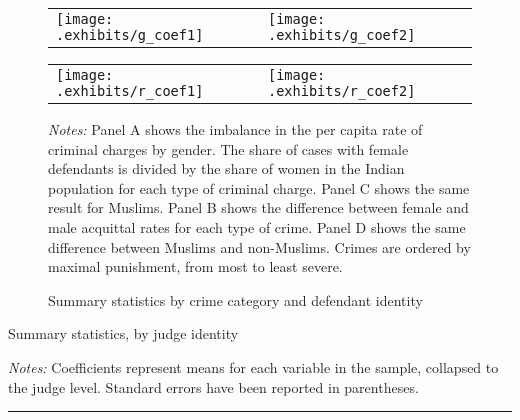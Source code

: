 \documentclass[12pt,english]{article}
\begin{document}
    \begin{sidewaysfigure}
      \centering
      \caption{Summary statistics by
        crime category and defendant identity}
      \label{fig:summary}
            \begin{tabular}{@{}ll@{}}
        \texttt{[image: .exhibits/g\_coef1]} &
        \texttt{[image: .exhibits/g\_coef2]} \\
      \end{tabular}
      \begin{tabular}{@{}ll@{}}
        \texttt{[image: .exhibits/r\_coef1]} &
        \texttt{[image: .exhibits/r\_coef2]} \\
      \end{tabular}
      
  \begin{minipage}{1.0\textwidth}
    {\scriptsize \emph{Notes:}       Panel A shows the imbalance in the per capita rate of criminal charges by gender.  The share of cases with female defendants is divided by the share of women in the Indian population for each type of criminal charge. Panel C shows the same result for Muslims. Panel B shows the difference between female and male acquittal rates for each type of crime. Panel D shows the same difference between Muslims and non-Muslims. Crimes are ordered by maximal punishment, from most to least severe.


 \par}
   \end{minipage}
  \end{sidewaysfigure}


  \begin{table}[ht]
    \begin{center}
      \caption{Summary statistics, by judge identity}
      \label{tab:judge_sam}
     
    \begin{minipage}{0.95\textwidth}
    {\footnotesize \vspace{1mm}\emph{Notes:} Coefficients represent means for each variable in the sample, collapsed to the judge level. Standard errors have been reported in parentheses. \par} \vspace{1mm} 
    \hrule
   \end{minipage}
    \end{center}
  \end{table}
\end{document}
